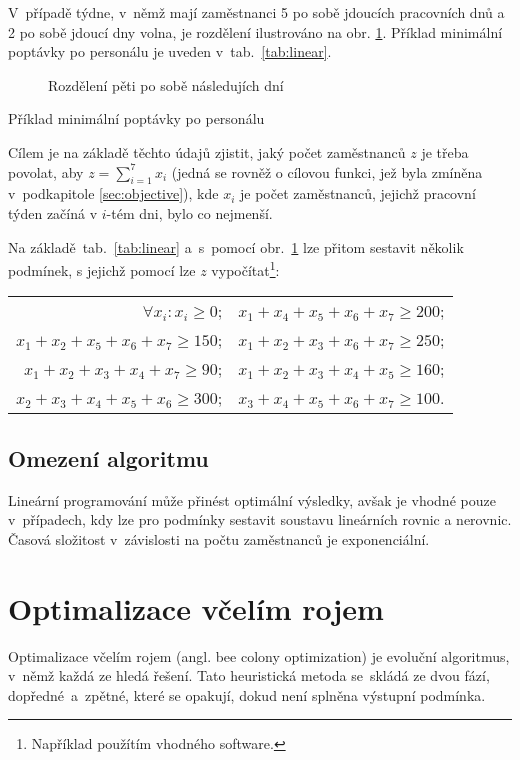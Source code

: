 \documentclass[twoside]{ctuthesis}
\begin{document}
V~případě týdne, v~němž mají zaměstnanci 5 po sobě jdoucích pracovních dnů a 2 po sobě jdoucí dny volna, je rozdělení ilustrováno na obr. \ref{fig:linear}. Příklad minimální poptávky po personálu je uveden v~tab.~\ref{tab:linear}.

\begin{figure}[h]
	
	\caption{Rozdělení pěti po sobě následujích dní}
	\label{fig:linear}
\end{figure}

\begin{table}[h]
	
	\caption{Příklad minimální poptávky po personálu}
	\label{tab:linear}
\end{table}

Cílem je na základě těchto údajů zjistit, jaký počet zaměstnanců $z$ je třeba povolat, aby $z = \sum_{i=1}^{7} x_i$ (jedná se rovněž o cílovou funkci, jež byla zmíněna v~podkapitole \ref{sec:objective}), kde $x_i$ je počet zaměstnanců, jejichž pracovní týden začíná v $i$-tém dni, bylo co nejmenší.

Na základě~tab.~\ref{tab:linear} a~s~pomocí obr.~\ref{fig:linear} lze přitom sestavit několik podmínek, s jejichž pomocí lze $z$ vypočítat\footnote{Například použítím vhodného software.}:
\begin{center}
	\begin{tabular}{rl}
		$\forall x_i: x_i \geq 0$; & $x_1 + x_4 + x_5 + x_6 + x_7 \geq 200$; \\
		$x_1 + x_2 + x_5 + x_6 + x_7 \geq 150$; & $x_1 + x_2 + x_3 + x_6 + x_7 \geq 250$;\\
		$x_1 + x_2 + x_3 + x_4 + x_7 \geq 90$; & $x_1 + x_2 + x_3 + x_4 + x_5 \geq 160$; \\
		$x_2 + x_3 + x_4 + x_5 + x_6 \geq 300$; & $x_3 + x_4 + x_5 + x_6 + x_7 \geq 100$.
	\end{tabular}
\end{center}

\subsection{Omezení algoritmu}

Lineární programování může přinést optimální výsledky, avšak je vhodné pouze v~případech, kdy lze pro podmínky sestavit soustavu lineárních rovnic a nerovnic. Časová složitost v~závislosti na počtu zaměstnanců je exponenciální. \cite{chen2016comparison}


\newpage
\section{Optimalizace včelím rojem}
Optimalizace včelím rojem (angl. bee colony optimization) je evoluční algoritmus, v~němž každá ze  hledá řešení. Tato heuristická metoda se~skládá ze dvou fází, dopředné~a~zpětné, které se opakují, dokud není splněna výstupní podmínka.
\end{document}
